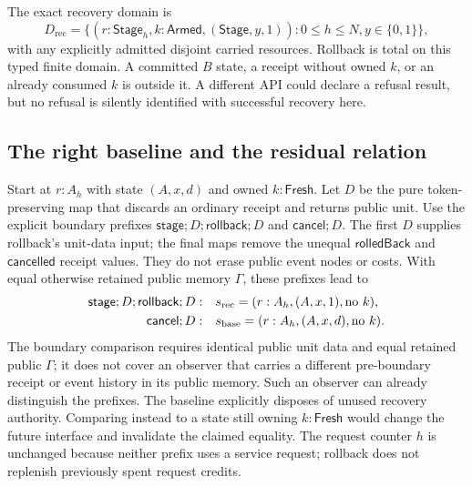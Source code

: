 \documentclass[11pt,a4paper]{article}
\theoremstyle{definition}
\begin{document}
The exact recovery domain is
\begin{equation}\label{eq:recovery-domain}
 D_{\mathrm{rec}}=\{(r:\mathsf{Stage}_h,k:\mathsf{Armed},
                  (\mathsf{Stage},y,1)):0\le h\le N, y\in\{0,1\}\},
\end{equation}
with any explicitly admitted disjoint carried resources. Rollback is
total on this typed finite domain. A committed $B$ state, a receipt
without owned $k$, or an already consumed $k$ is outside it. A different
API could declare a refusal result, but no refusal is silently identified
with successful recovery here.

\subsection{The right baseline and the residual relation}
Start at $r:A_h$ with state $(A,x,d)$ and owned $k:\mathsf{Fresh}$.
Let $D$ be the pure token-preserving map that discards an ordinary
receipt and returns public unit. Use the explicit boundary prefixes
$\mathsf{stage};D;\mathsf{rollback};D$ and
$\mathsf{cancel};D$. The first $D$ supplies rollback's unit-data input;
the final maps remove the unequal $\mathsf{rolledBack}$ and
$\mathsf{cancelled}$ receipt values. They do not erase public event
nodes or costs. With equal otherwise retained public memory $\Gamma$,
these prefixes lead to
\begin{align}\label{eq:residual-states}
 \mathsf{stage};D;\mathsf{rollback};D:&\quad
 s_{\mathrm{rec}}=(r:A_h,(A,x,1),\text{no }k),\notag\\
 \mathsf{cancel};D:&\quad
 s_{\mathrm{base}}=(r:A_h,(A,x,d),\text{no }k).
\end{align}
The boundary comparison requires identical public unit data and equal
retained public $\Gamma$; it does not cover an observer that carries a
different pre-boundary receipt or event history in its public memory.
Such an observer can already distinguish the prefixes. The baseline
explicitly disposes of unused recovery authority. Comparing
instead to a state still owning $k:\mathsf{Fresh}$ would change the
future interface and invalidate the claimed equality. The request
counter $h$ is unchanged because neither prefix uses a service request;
rollback does not replenish previously spent request credits.
\end{document}
